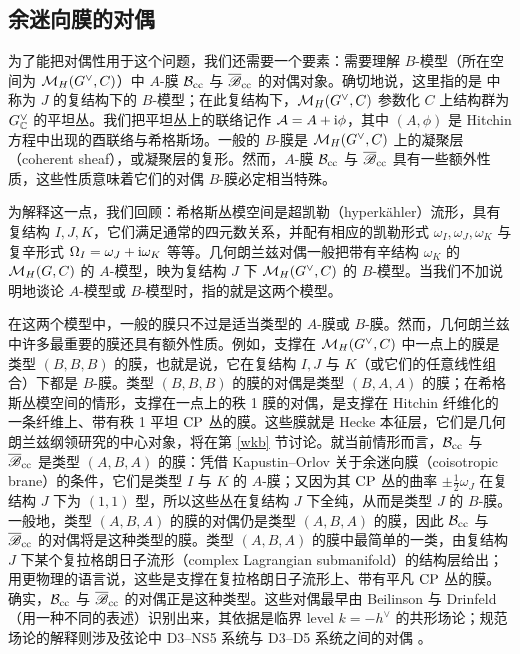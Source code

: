 
\subsection{余迷向膜的对偶}\label{dualco}

为了能把对偶性用于这个问题，我们还需要一个要素：需要理解 $B$-模型（所在空间为 ${\mathcal M}_H(G^\vee,C)$）中 $A$-膜 ${\mathcal B}_{\mathrm{cc}}$ 与 ${\overline {\mathscr B}}_{\mathrm{cc}}$ 的对偶对象。确切地说，这里指的是 \cite{H} 中称为 $J$ 的复结构下的 $B$-模型；在此复结构下，${\mathcal M}_H(G^\vee,C)$ 参数化 $C$ 上结构群为 $G^\vee_{\mathbb C}$ 的平坦丛。我们把平坦丛上的联络记作 ${\mathcal A}=A+{\mathrm i}\phi$，其中 $(A,\phi)$ 是 Hitchin 方程中出现的酉联络与希格斯场。一般的 $B$-膜是 ${\mathcal M}_H(G^\vee,C)$ 上的凝聚层（coherent sheaf），或凝聚层的复形。然而，$A$-膜 ${\mathcal B}_{\mathrm{cc}}$ 与 ${\overline {\mathscr B}}_{\mathrm{cc}}$ 具有一些额外性质，这些性质意味着它们的对偶 $B$-膜必定相当特殊。

为解释这一点，我们回顾：希格斯丛模空间是超凯勒（hyperkähler）流形，具有复结构 $I,J,K$，它们满足通常的四元数关系，并配有相应的凯勒形式 $\omega_I,\omega_J,\omega_K$ 与复辛形式 $\Omega_I=\omega_J+{\mathrm i} \omega_K$ 等等。几何朗兰兹对偶一般把带有辛结构 $\omega_K$ 的 ${\mathcal M}_H(G,C)$ 的 $A$-模型，映为复结构 $J$ 下 ${\mathcal M}_H(G^\vee,C)$ 的 $B$-模型。当我们不加说明地谈论 $A$-模型或 $B$-模型时，指的就是这两个模型。

在这两个模型中，一般的膜只不过是适当类型的 $A$-膜或 $B$-膜。然而，几何朗兰兹中许多最重要的膜还具有额外性质。例如，支撑在 ${\mathcal M}_H(G^\vee,C)$ 中一点上的膜是类型 $(B,B,B)$ 的膜，也就是说，它在复结构 $I,J$ 与 $K$（或它们的任意线性组合）下都是 $B$-膜。类型 $(B,B,B)$ 的膜的对偶是类型 $(B,A,A)$ 的膜；在希格斯丛模空间的情形，支撑在一点上的秩 1 膜的对偶，是支撑在 Hitchin 纤维化的一条纤维上、带有秩 1 平坦 ${\mathrm{CP}}$ 丛的膜。这些膜就是 Hecke 本征层，它们是几何朗兰兹纲领研究的中心对象，将在第 \ref{wkb} 节讨论。就当前情形而言，${\mathcal B}_{\mathrm{cc}}$ 与 ${\overline {\mathscr B}}_{\mathrm{cc}}$ 是类型 $(A,B,A)$ 的膜：凭借 Kapustin–Orlov 关于余迷向膜（coisotropic brane）的条件，它们是类型 $I$ 与 $K$ 的 $A$-膜；又因为其 ${\mathrm{CP}}$ 丛的曲率 $\pm\frac{1}{2}\omega_J$ 在复结构 $J$ 下为 $(1,1)$ 型，所以这些丛在复结构 $J$ 下全纯，从而是类型 $J$ 的 $B$-膜。一般地，类型 $(A,B,A)$ 的膜的对偶仍是类型 $(A,B,A)$ 的膜，因此 ${\mathcal B}_{\mathrm{cc}}$ 与 ${\overline {\mathscr B}}_{\mathrm{cc}}$ 的对偶将是这种类型的膜。类型 $(A,B,A)$ 的膜中最简单的一类，由复结构 $J$ 下某个复拉格朗日子流形（complex Lagrangian submanifold）的结构层给出；用更物理的语言说，这些是支撑在复拉格朗日子流形上、带有平凡 ${\mathrm{CP}}$ 丛的膜。确实，${\mathcal B}_{\mathrm{cc}}$ 与 ${\overline {\mathscr B}}_{\mathrm{cc}}$ 的对偶正是这种类型。这些对偶最早由 Beilinson 与 Drinfeld \cite{BD}（用一种不同的表述）识别出来，其依据是临界 level $k=-h^\vee$ 的共形场论；规范场论的解释则涉及弦论中 D3–NS5 系统与 D3–D5 系统之间的对偶 \cite{GWknots}。

